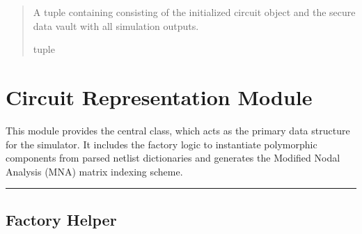 \documentclass[letterpaper,10pt,english]{sphinxmanual}
\begin{document}
\begin{fulllineitems}
\begin{quote}
\begin{description}
\begin{itemize}
\end{itemize}

\sphinxAtStartPar
A tuple containing  consisting of the initialized circuit object and the secure data vault with all simulation outputs.

\sphinxAtStartPar
tuple

\end{description}\end{quote}

\end{fulllineitems}


\sphinxstepscope


\chapter{Circuit Representation Module}
\label{\detokenize{circuit:circuit-representation-module}}\label{\detokenize{circuit:circuit-module}}\label{\detokenize{circuit::doc}}
\sphinxAtStartPar
This module provides the central  class, which acts as the primary data
structure for the simulator. It includes the factory logic to instantiate polymorphic components from parsed netlist dictionaries and generates the Modified Nodal Analysis (MNA) matrix indexing scheme.


\bigskip\hrule\bigskip



\section{Factory Helper}
\label{\detokenize{circuit:factory-helper}}
\end{document}
